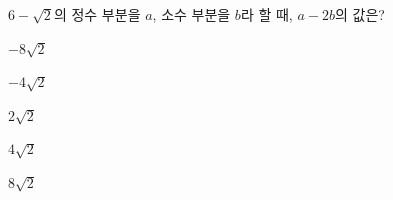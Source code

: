 $6-\sqrt{2}$의 정수 부분을 $a$, 소수 부분을 $b$라 할 때, $a-2b$의 값은?
\begin{choices32}{\rule[-3ex]{0pt}{8ex}$-8\sqrt{2}$}{\rule[-3ex]{0pt}{8ex}$-4\sqrt{2}$}{\rule[-3ex]{0pt}{8ex}$2\sqrt{2}$}{\rule[-3ex]{0pt}{8ex}$4\sqrt{2}$}{\rule[-3ex]{0pt}{8ex}$8\sqrt{2}$}\end{choices32}
